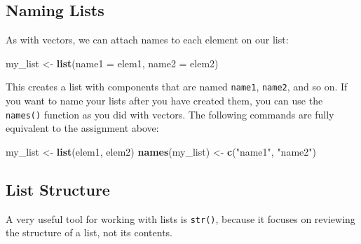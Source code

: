 \documentclass[
]{book}
\newenvironment{Shaded}{\begin{snugshade}}{\end{snugshade}}
\newcommand{\CommentTok}[1]{\textcolor[rgb]{0.56,0.35,0.01}{\textit{#1}}}
\newcommand{\DataTypeTok}[1]{\textcolor[rgb]{0.13,0.29,0.53}{#1}}
\newcommand{\DecValTok}[1]{\textcolor[rgb]{0.00,0.00,0.81}{#1}}
\newcommand{\KeywordTok}[1]{\textcolor[rgb]{0.13,0.29,0.53}{\textbf{#1}}}
\newcommand{\NormalTok}[1]{#1}
\newcommand{\OperatorTok}[1]{\textcolor[rgb]{0.81,0.36,0.00}{\textbf{#1}}}
\newcommand{\StringTok}[1]{\textcolor[rgb]{0.31,0.60,0.02}{#1}}
\begin{document}
\hypertarget{naming-lists}{%
\subsection{Naming Lists}\label{naming-lists}}

As with vectors, we can attach names to each element on our list:

\begin{Shaded}
\begin{Highlighting}[]
\NormalTok{my_list <-}\StringTok{ }\KeywordTok{list}\NormalTok{(}\DataTypeTok{name1 =}\NormalTok{ elem1, }
                \DataTypeTok{name2 =}\NormalTok{ elem2)}
\end{Highlighting}
\end{Shaded}

This creates a list with components that are named \texttt{name1}, \texttt{name2}, and so on. If you want to name your lists after you have created them, you can use the \texttt{names()} function as you did with vectors. The following commands are fully equivalent to the assignment above:

\begin{Shaded}
\begin{Highlighting}[]
\NormalTok{my_list <-}\StringTok{ }\KeywordTok{list}\NormalTok{(elem1, elem2)}
\KeywordTok{names}\NormalTok{(my_list) <-}\StringTok{ }\KeywordTok{c}\NormalTok{(}\StringTok{"name1"}\NormalTok{, }\StringTok{"name2"}\NormalTok{)}
\end{Highlighting}
\end{Shaded}

\hypertarget{list-structure}{%
\subsection{List Structure}\label{list-structure}}

A very useful tool for working with lists is \texttt{str()}, because it focuses on reviewing the structure of a list, not its contents.

\begin{Shaded}
\end{Shaded}
\end{document}

